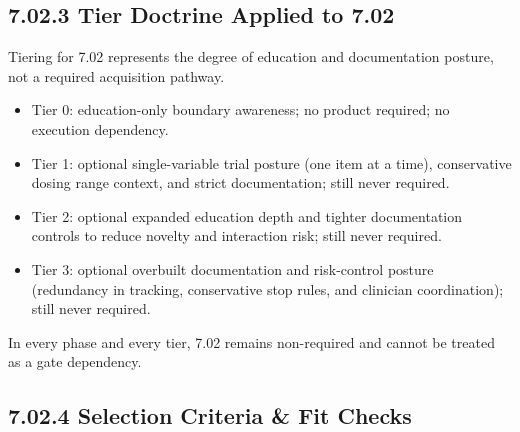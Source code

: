 \documentclass[10pt]{article}
\begin{document}
\subsection*{7.02.3 Tier Doctrine Applied to 7.02}
{}

Tiering for 7.02 represents the degree of education and documentation posture, not a required acquisition pathway.

\begin{itemize}
\item Tier 0: education-only boundary awareness; no product required; no execution dependency.
\item Tier 1: optional single-variable trial posture (one item at a time), conservative dosing range context, and strict documentation; still never required.
\item Tier 2: optional expanded education depth and tighter documentation controls to reduce novelty and interaction risk; still never required.
\item Tier 3: optional overbuilt documentation and risk-control posture (redundancy in tracking, conservative stop rules, and clinician coordination); still never required.
\end{itemize}

In every phase and every tier, 7.02 remains non-required and cannot be treated as a gate dependency.

\subsection*{7.02.4 Selection Criteria \& Fit Checks}
{}
\end{document}
